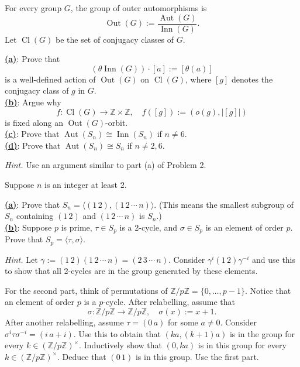 \documentclass[12pt]{article}
\begin{document}
\begin{homeworkProblem}
  For every group $G$, the group of outer automorphisms is
  \[
    \operatorname{Out}(G) := \frac{\operatorname{Aut}(G)}{\operatorname{Inn}(G)}.
  \]
  Let $\operatorname{Cl}(G)$ be the set of conjugacy classes of $G$.  

  \underline{\textbf{(a)}}: Prove that
  \[
    (\theta \operatorname{Inn}(G)) \cdot [a] := [\theta(a)]
  \]
  is a well-defined action of $\operatorname{Out}(G)$ on $\operatorname{Cl}(G)$, where $[g]$ denotes the conjugacy class of $g$ in $G$.\\

  \underline{\textbf{(b)}}: Argue why
  \[
    f : \operatorname{Cl}(G) \to \mathbb{Z} \times \mathbb{Z}, \quad f([g]) := (o(g), \lvert [g] \rvert)
  \]
  is fixed along an $\operatorname{Out}(G)$-orbit.\\

  \underline{\textbf{(c)}}: Prove that $\operatorname{Aut}(S_n) \cong \operatorname{Inn}(S_n)$ if $n \ne 6$.\\

  \underline{\textbf{(d)}}: Prove that $\operatorname{Aut}(S_n) \cong S_n$ if $n \ne 2, 6$.

  \textit{Hint.} Use an argument similar to part (a) of Problem 2.
\end{homeworkProblem}

\begin{homeworkProblem}
  Suppose $n$ is an integer at least $2$.

  \underline{\textbf{(a)}}: Prove that $S_n = \langle (1\,2), (1\,2\,\cdots\,n) \rangle$.  
  (This means the smallest subgroup of $S_n$ containing $(1\,2)$ and $(1\,2\,\cdots\,n)$ is $S_n$.)\\

  \underline{\textbf{(b)}}: Suppose $p$ is prime, $\tau \in S_p$ is a 2-cycle, and $\sigma \in S_p$ is an element of order $p$.  
  Prove that $S_p = \langle \tau, \sigma \rangle$.

  \textit{Hint.} Let $\gamma := (1\,2)(1\,2\,\cdots\,n) = (2\,3\,\cdots\,n)$.  
  Consider $\gamma^i (1\,2) \gamma^{-i}$ and use this to show that all 2-cycles are in the group generated by these elements.  

  For the second part, think of permutations of $\mathbb{Z}/p\mathbb{Z} = \{0, \dots, p-1\}$.  
  Notice that an element of order $p$ is a $p$-cycle. After relabelling, assume that
  \[
    \sigma : \mathbb{Z}/p\mathbb{Z} \to \mathbb{Z}/p\mathbb{Z}, \quad \sigma(x) := x + 1.
  \]
  After another relabelling, assume $\tau = (0\, a)$ for some $a \ne 0$.  
  Consider $\sigma^i \tau \sigma^{-i} = (i\, a+i)$. Use this to obtain that $(ka, (k+1)a)$ is in the group for every $k \in (\mathbb{Z}/p\mathbb{Z})^\times$.  
  Inductively show that $(0, ka)$ is in this group for every $k \in (\mathbb{Z}/p\mathbb{Z})^\times$.  
  Deduce that $(0\,1)$ is in this group. Use the first part.
\end{homeworkProblem}
\end{document}
